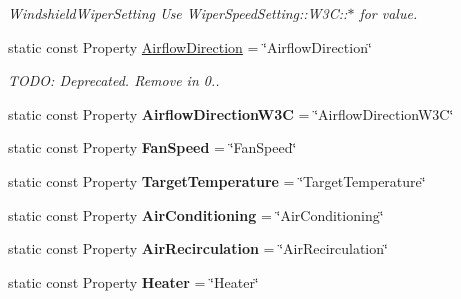 \begin{DoxyCompactItemize}
\begin{DoxyCompactList}\small\item\em Windshield\+Wiper\+Setting Use Wiper\+Speed\+Setting\+::\+W3\+C\+:\+:$\ast$ for value. \end{DoxyCompactList}\item 
\hypertarget{classVehicleProperty_adeeec47dbbcc60ee78b30c8c1a917836}{static const Property \hyperlink{classVehicleProperty_adeeec47dbbcc60ee78b30c8c1a917836}{Airflow\+Direction} = \char`\"{}Airflow\+Direction\char`\"{}}\label{classVehicleProperty_adeeec47dbbcc60ee78b30c8c1a917836}

\begin{DoxyCompactList}\small\item\em T\+O\+D\+O\+: Deprecated. Remove in 0.. \end{DoxyCompactList}\item 
\hypertarget{classVehicleProperty_ac64308c4604fcdcc341621256923e25f}{static const Property {\bfseries Airflow\+Direction\+W3\+C} = \char`\"{}Airflow\+Direction\+W3\+C\char`\"{}}\label{classVehicleProperty_ac64308c4604fcdcc341621256923e25f}

\item 
\hypertarget{classVehicleProperty_afd2a544499ec8ddc83127ef268f9e5e5}{static const Property {\bfseries Fan\+Speed} = \char`\"{}Fan\+Speed\char`\"{}}\label{classVehicleProperty_afd2a544499ec8ddc83127ef268f9e5e5}

\item 
\hypertarget{classVehicleProperty_a14d5cc6734fa65eb1e352d9ddbe05c17}{static const Property {\bfseries Target\+Temperature} = \char`\"{}Target\+Temperature\char`\"{}}\label{classVehicleProperty_a14d5cc6734fa65eb1e352d9ddbe05c17}

\item 
\hypertarget{classVehicleProperty_a45738d294fe38c6fa5f198c30b17153c}{static const Property {\bfseries Air\+Conditioning} = \char`\"{}Air\+Conditioning\char`\"{}}\label{classVehicleProperty_a45738d294fe38c6fa5f198c30b17153c}

\item 
\hypertarget{classVehicleProperty_aa5c99592d51aa0a05eb277563c2273d7}{static const Property {\bfseries Air\+Recirculation} = \char`\"{}Air\+Recirculation\char`\"{}}\label{classVehicleProperty_aa5c99592d51aa0a05eb277563c2273d7}

\item 
\hypertarget{classVehicleProperty_ad5a3fdf51333943c486fa216e894cb29}{static const Property {\bfseries Heater} = \char`\"{}Heater\char`\"{}}\label{classVehicleProperty_ad5a3fdf51333943c486fa216e894cb29}


\end{DoxyCompactItemize}
